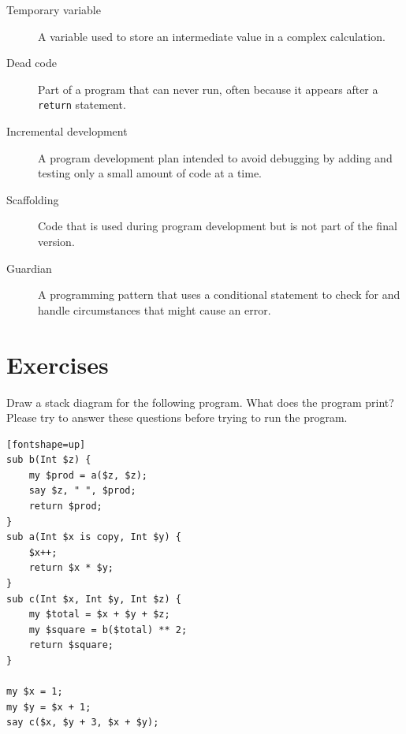 \begin{description}

\item[Temporary variable]  A variable used to store an intermediate value in
a complex calculation.

\item[Dead code]  Part of a program that can never run, often because
it appears after a {\tt return} statement.

\item[Incremental development]  A program development plan intended to
avoid debugging by adding and testing only
a small amount of code at a time.

\item[Scaffolding]  Code that is used during program development but is
not part of the final version.

\item[Guardian]  A programming pattern that uses a conditional
statement to check for and handle circumstances that
might cause an error.

\end{description}


\section{Exercises}

\begin{exercise}

Draw a stack diagram for the following program.  What does 
the program print? Please try to answer these questions before 
trying to run the program.

\begin{verbatim}[fontshape=up]
sub b(Int $z) {
    my $prod = a($z, $z);
    say $z, " ", $prod;
    return $prod;
}
sub a(Int $x is copy, Int $y) {
    $x++;
    return $x * $y;
}
sub c(Int $x, Int $y, Int $z) {
    my $total = $x + $y + $z;
    my $square = b($total) ** 2;
    return $square;
}

my $x = 1;
my $y = $x + 1;
say c($x, $y + 3, $x + $y);
\end{verbatim}

\end{exercise}


